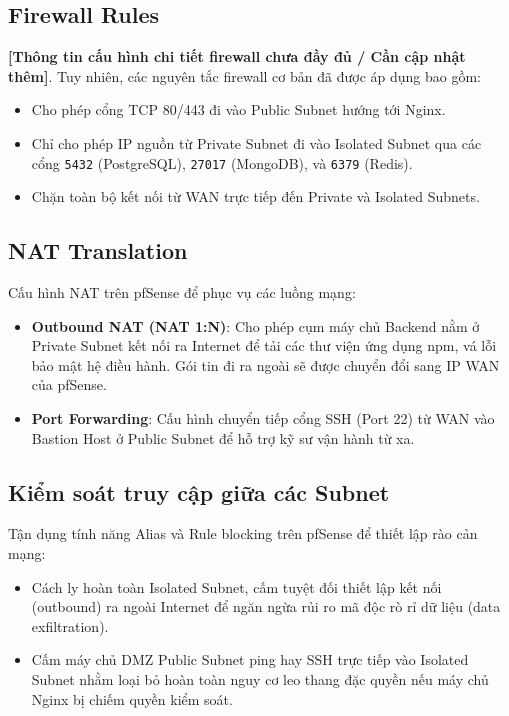 \documentclass[12pt, a4paper]{article}
\begin{document}
\subsection{Firewall Rules}
\textbf{[Thông tin cấu hình chi tiết firewall chưa đầy đủ / Cần cập nhật thêm]}. Tuy nhiên, các nguyên tắc firewall cơ bản đã được áp dụng bao gồm:
\begin{itemize}
    \item Cho phép cổng TCP 80/443 đi vào Public Subnet hướng tới Nginx.
    \item Chỉ cho phép IP nguồn từ Private Subnet đi vào Isolated Subnet qua các cổng \texttt{5432} (PostgreSQL), \texttt{27017} (MongoDB), và \texttt{6379} (Redis).
    \item Chặn toàn bộ kết nối từ WAN trực tiếp đến Private và Isolated Subnets.
\end{itemize}

\subsection{NAT Translation}
Cấu hình NAT trên pfSense để phục vụ các luồng mạng:
\begin{itemize}
    \item \textbf{Outbound NAT (NAT 1:N)}: Cho phép cụm máy chủ Backend nằm ở Private Subnet kết nối ra Internet để tải các thư viện ứng dụng npm, vá lỗi bảo mật hệ điều hành. Gói tin đi ra ngoài sẽ được chuyển đổi sang IP WAN của pfSense.
    \item \textbf{Port Forwarding}: Cấu hình chuyển tiếp cổng SSH (Port 22) từ WAN vào Bastion Host ở Public Subnet để hỗ trợ kỹ sư vận hành từ xa.
\end{itemize}

\subsection{Kiểm soát truy cập giữa các Subnet}
Tận dụng tính năng Alias và Rule blocking trên pfSense để thiết lập rào cản mạng:
\begin{itemize}
    \item Cách ly hoàn toàn Isolated Subnet, cấm tuyệt đối thiết lập kết nối (outbound) ra ngoài Internet để ngăn ngừa rủi ro mã độc rò rỉ dữ liệu (data exfiltration).
    \item Cấm máy chủ DMZ Public Subnet ping hay SSH trực tiếp vào Isolated Subnet nhằm loại bỏ hoàn toàn nguy cơ leo thang đặc quyền nếu máy chủ Nginx bị chiếm quyền kiểm soát.
\end{itemize}
\end{document}
